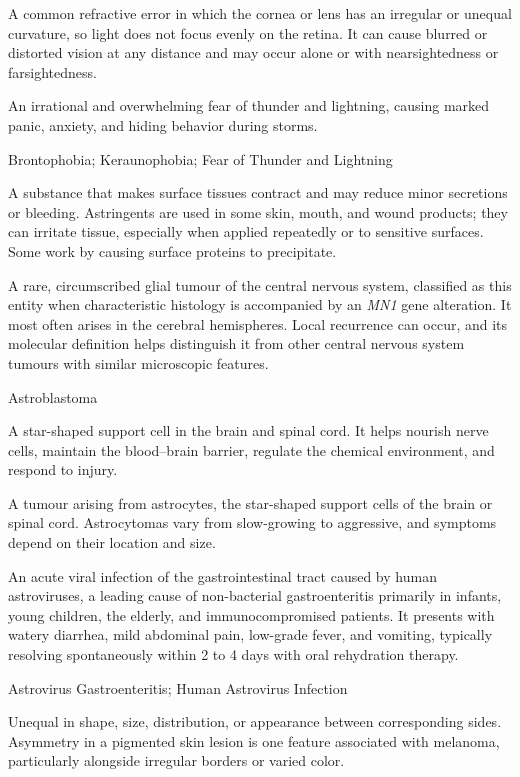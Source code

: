  A common refractive error in which the cornea or lens has an irregular or unequal curvature, so light does not focus evenly on the retina. It can cause blurred or distorted vision at any distance and may occur alone or with nearsightedness or farsightedness.

 An irrational and overwhelming fear of thunder and lightning, causing marked panic, anxiety, and hiding behavior during storms.

\synonyms
Brontophobia; Keraunophobia; Fear of Thunder and Lightning

 A substance that makes surface tissues contract and may reduce minor
secretions or bleeding. Astringents are used in some skin, mouth, and wound products; they
can irritate tissue, especially when applied repeatedly or to sensitive surfaces. Some work
by causing surface proteins to precipitate.

 A rare, circumscribed glial tumour of the central nervous
system, classified as this entity when characteristic histology is accompanied by an \textit{MN1}
gene alteration. It most often arises in the cerebral hemispheres. Local recurrence can occur,
and its molecular definition helps distinguish it from other central nervous system tumours with
similar microscopic features.

\synonyms
Astroblastoma

 A star-shaped support cell in the brain and spinal cord. It helps nourish nerve cells, maintain the blood–brain barrier, regulate the chemical environment, and respond to injury.

 A tumour arising from astrocytes, the star-shaped support cells of the brain or spinal cord. Astrocytomas vary from slow-growing to aggressive, and symptoms depend on their location and size.

 An acute viral infection of the gastrointestinal tract caused by human astroviruses, a leading cause of non-bacterial gastroenteritis primarily in infants, young children, the elderly, and immunocompromised patients. It presents with watery diarrhea, mild abdominal pain, low-grade fever, and vomiting, typically resolving spontaneously within 2 to 4 days with oral rehydration therapy.

\synonyms
Astrovirus Gastroenteritis; Human Astrovirus Infection

 Unequal in shape, size, distribution, or appearance between corresponding sides. Asymmetry in a pigmented skin lesion is one feature associated with melanoma, particularly alongside irregular borders or varied color.


